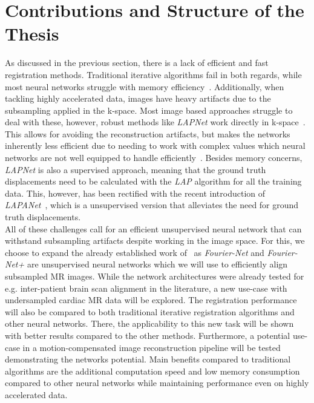 \section{Contributions and Structure of the Thesis} \label{Sec:ContributionsAndStructure}
As discussed in the previous section, there is a lack of efficient and fast registration methods. Traditional iterative algorithms fail in both regards, while most neural networks struggle with memory efficiency~\cite{Fourier-Net,Fourier-Net+}. Additionally, when tackling highly accelerated data, images have heavy artifacts due to the subsampling applied in the k-space. Most image based approaches struggle to deal with these, however, robust methods like \emph{LAPNet} work directly in k-space~\cite{LAPNet}. This allows for avoiding the reconstruction artifacts, but makes the networks inherently less efficient due to needing to work with complex values which neural networks are not well equipped to handle efficiently~\cite{Trabelsi2017}. Besides memory concerns, \emph{LAPNet} is also a supervised approach, meaning that the ground truth displacements need to be calculated with the \emph{LAP} algorithm for all the training data. This, however, has been rectified with the recent introduction of \emph{LAPANet}~\cite{LAPANet}, which is a unsupervised version that alleviates the need for ground truth displacements.\\
All of these challenges call for an efficient unsupervised neural network that can withstand subsampling artifacts despite working in the image space. For this, we choose to expand the already established work of~\cite{Fourier-Net,Fourier-Net+} as \emph{Fourier-Net} and \emph{Fourier-Net+} are unsupervised neural networks which we will use to efficiently align subsampled MR images. While the network architectures were already tested for e.g. inter-patient brain scan alignment in the literature, a new use-case with undersampled cardiac MR data will be explored. The registration performance will also be compared to both traditional iterative registration algorithms and other neural networks. There, the applicability to this new task will be shown with better results compared to the other methods. Furthermore, a potential use-case in a motion-compensated image reconstruction pipeline will be tested demonstrating the networks potential. Main benefits compared to traditional algorithms are the additional computation speed and low memory consumption compared to other neural networks while maintaining performance even on highly accelerated data. \\
